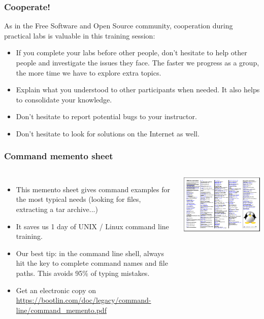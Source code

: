 \begin{frame}
\frametitle{Cooperate!}
As in the Free Software and Open Source community,
cooperation during practical labs is valuable in this training session:
\begin{itemize}
\item If you complete your labs before other people, don't hesitate to help
other people and investigate the issues they face. The faster we progress as a
group, the more time we have to explore extra topics.
\item Explain what you understood to other participants when needed.
It also helps to consolidate your knowledge.
\item Don't hesitate to report potential bugs to your instructor.
\item Don't hesitate to look for solutions on the Internet as well.
\end{itemize}
\end{frame}

\begin{frame}
  \frametitle{Command memento sheet}
  \begin{columns}
    \begin{itemize}
       \item This memento sheet gives command examples for the most
       typical needs (looking for files, extracting a tar archive...)
       \item It saves us 1 day of UNIX / Linux command line training.
       \item Our best tip: in the command line shell, always hit the
        key to complete command names and file paths.
       This avoids 95\% of typing mistakes.
       \item Get an electronic copy on
       \url{https://bootlin.com/doc/legacy/command-line/command_memento.pdf}
    \end{itemize}
    \includegraphics[width=\textwidth]{slides/course-information/command_memento.png}
  \end{columns}
\end{frame}


